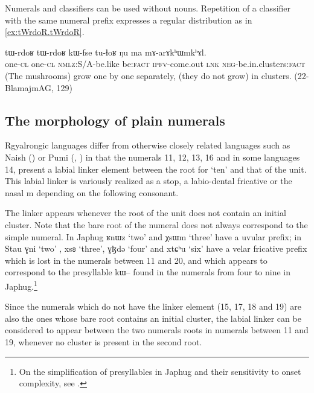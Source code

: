 \documentclass[oldfontcommands,oneside,a4paper,12pt]{article}
\newcommand{\ipa}[1]{{\phon#1}}
\begin{document}
 Numerals and classifiers can be used without nouns. Repetition of a classifier with the same numeral prefix  expresses a regular distribution as in \ref{ex:tWrdoR.tWrdoR}.
 
 \begin{exe}
\ex \label{ex:tWrdoR.tWrdoR}
\gll 
 \ipa{tɯ-rdoʁ} 	\ipa{tɯ-rdoʁ} 	\ipa{kɯ-fse} 	\ipa{tu-ɬoʁ} 	\ipa{ŋu} 	\ipa{ma} 	\ipa{mɤ-arɤkʰɯmkʰɤl.}  \\
  one-\textsc{cl}  one-\textsc{cl} \textsc{nmlz}:S/A-be.like  be:\textsc{fact} \textsc{ipfv}-come.out \textsc{lnk} \textsc{neg}-be.in.clusters:\textsc{fact} \\
 \glt (The mushrooms) grow one by one separately, (they do not grow) in clusters. (22-BlamajmAG, 129)
\end{exe}
 
 \subsection{The morphology of plain numerals}
 
 Rgyalrongic languages differ from otherwise closely related languages such as Naish (\citealt{michaud11cl}) or Pumi (\citealt[141]{daudey14grammar}, \citealt[91-2]{ding14grammar}) in that the numerals 11, 12, 13, 16  and in some languages 14, present a labial linker element between the root for `ten' and that of the unit.  
 This labial linker  is variously realized as a stop, a labio-dental fricative or the nasal \ipa{m} depending on the following consonant.
 
 The linker appears whenever  the root of the unit does not contain an initial cluster. Note that the bare root of the numeral does not always correspond to the simple numeral. In Japhug \ipa{ʁnɯz}  `two' and 	\ipa{χsɯm} `three'  have a uvular prefix; in Stau \ipa{ɣni} `two' , \ipa{xsʚ} `three', \ipa{ɣɮdə} `four' and 	\ipa{xtɕʰu} `six'  have a velar fricative prefix which is lost in the numerals between 11 and 20, and which appears to correspond  to the presyllable \ipa{kɯ--} found in the numerals from four to nine in Japhug.\footnote{On the simplification of presyllables in Japhug and their sensitivity to onset complexity, see \citet{jacques14antipassive}.}
 
Since the numerals which do not have the linker element (15, 17, 18 and 19) are also the ones whose bare root contains an initial cluster, the labial linker can be considered to appear between the two numerals roots in numerals between 11 and 19, whenever no cluster is present in the second root.
 
\end{document}
